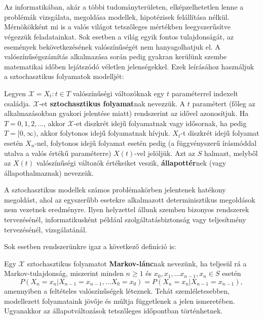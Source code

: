 \chapter{\bevezetes}

Az informatikában, akár a többi tudományterületen, elképzelhetetlen lenne a problémák vizsgálata, megoldása modellek, hipotézisek felállítása nélkül. Mérnökökként mi is a valós világot tetszőleges mértékben leegyszerűsítve végezzük feladatainkat. Sok esetben a világ egyik fontos tulajdonságát, az események bekövetkezésének valószínűségét nem hanyagolhatjuk el. A valószínűségszámítás alkalmazása során pedig gyakran kerülünk szembe matematikai időben lejátszódó véletlen jelenségekkel. Ezek leírásához használjuk a sztochasztikus folyamatok modelljét:

\begin{definition}
	Legyen $\mathcal{X}={X_t:t \in T}$ valószínűségi változóknak egy $t$ paraméterrel indexelt családja. $\mathcal{X}$-et \textbf{sztochasztikus folyamat}nak nevezzük. A $t$ paramétert (főleg az alkalmazásokban gyakori jelentése miatt) rendszerint az idővel azonosítjuk. Ha $T = {0,1,2,\dots}$, akkor $\mathcal{X}$-et diszkrét idejű folyamatnak vagy idősornak, ha pedig $T=[0,\infty)$, akkor folytonos idejű folyamatnak hívjuk. $X_t$-t diszkrét idejű folyamat esetén $X_n$-nel, folytonos idejű folyamat esetén pedig (a függvényszerű írásmóddal utalva a valós értékű paraméterre) $X(t)$-vel jelöljük. Azt az $S$ halmazt, melyből az $X(t)$ valószínűségi változók értékeiket veszik, \textbf{állapottér}nek (vagy állapothalmaznak) nevezzük.
\end{definition}

A sztochasztikus modellek számos problémakörben jelentenek hatékony megoldást, ahol az egyszerűbb esetekre alkalmazott determinisztikus megoldások nem vezetnek eredményre.
Ilyen helyzettel állunk szemben bizonyos rendszerek tervezésénél, informatikusként például szolgáltatásbiztonság vagy teljesítmény tervezésénél, vizsgálatánál.

Sok esetben rendszerünkre igaz a következő definíció is:

\begin{definition}
	Egy $\mathcal{X}$ sztochasztikus folyamatot \textbf{Markov-lánc}nak nevezünk, ha teljesül rá a Markov-tulajdonság, miszerint minden $n\ge1$ és $x_0,x_1,\dots x_{n-1},x_n\in S$ esetén
	$$P(X_n=x_n|X_{n-1}=x_{n-1},\dots X_0=x_0) = P(X_n=x_n|X_{n-1}=x_{n-1}),$$
	amennyiben a feltételes valószínűségek léteznek.\cite{MarkovLancokKonyv}
	Tehát szemléletesebben, modellezett folyamataink jövője és múltja függetlenek a jelen ismeretében. Ugyanakkor az állapotváltozások tetszőleges időpontban történhetnek.
\end{definition}

